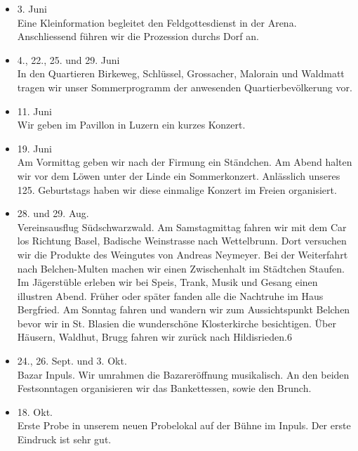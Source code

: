 \begin{history}
\begin{itemize}
        \item 3. Juni\\
              Eine Kleinformation begleitet den Feldgottesdienst in der Arena.
              Anschliessend führen wir die Prozession durchs Dorf an.

        \item 4., 22., 25. und 29. Juni\\
              In den Quartieren Birkeweg, Schlüssel, Grossacher, Malorain und Waldmatt
              tragen wir unser Sommerprogramm der anwesenden Quartierbevölkerung vor.

        \item 11. Juni\\
              Wir geben im Pavillon in Luzern ein kurzes Konzert.

        \item 19. Juni\\
              Am Vormittag geben wir nach der Firmung ein Ständchen. Am Abend halten
              wir vor dem Löwen unter der Linde ein Sommerkonzert. Anlässlich unseres
              125. Geburtstags haben wir diese einmalige Konzert im Freien
              organisiert.

        \item 28. und 29. Aug.\\
              Vereinsausflug Südschwarzwald. Am Samstagmittag fahren wir mit dem Car
              los Richtung Basel, Badische Weinstrasse nach Wettelbrunn. Dort
              versuchen wir die Produkte des Weingutes von Andreas Neymeyer. Bei der
              Weiterfahrt nach Belchen-Multen machen wir einen Zwischenhalt im
              Städtchen Staufen. Im Jägerstüble erleben wir bei Speis, Trank, Musik
              und Gesang einen illustren Abend. Früher oder später fanden alle die
              Nachtruhe im Haus Bergfried. Am Sonntag fahren und wandern wir zum
              Aussichtspunkt Belchen bevor wir in St. Blasien die wunderschöne
              Klosterkirche besichtigen. Über Häusern, Waldhut, Brugg fahren wir
              zurück nach Hildisrieden.6

        \item 24., 26. Sept. und 3. Okt.\\
              Bazar Inpuls. Wir umrahmen die Bazareröffnung musikalisch. An den beiden
              Festsonntagen organisieren wir das Bankettessen, sowie den Brunch.

        \item 18. Okt.\\
              Erste Probe in unserem neuen Probelokal auf der Bühne im Inpuls. Der
              erste Eindruck ist sehr gut.


\end{itemize}
\end{history}
